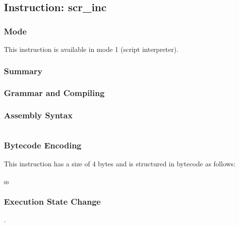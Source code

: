 \subsection{Instruction: scr\_inc}

\subsubsection{Mode}
This instruction is available in mode 1 (script interpreter).
\subsubsection{Summary}


\subsubsection{Grammar and Compiling}


\subsubsection{Assembly Syntax}

\begin{myquote}
\begin{verbatim}

\end{verbatim}
\end{myquote}

\subsubsection{Bytecode Encoding}

This instruction has a size of 4 bytes and is structured in bytecode as follows:

$_{00}$\ 


\subsubsection{Execution State Change}

.


